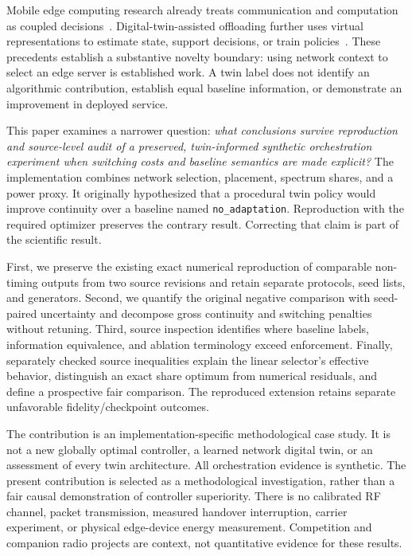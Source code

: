 \documentclass[10pt,twocolumn]{article}
\newcommand{\pol}[1]{\texttt{#1}}
\begin{document}
Mobile edge computing research already treats communication and computation as coupled decisions~\cite{mao2017survey}. Digital-twin-assisted offloading further uses virtual representations to estimate state, support decisions, or train policies~\cite{sun2020latency,dai2021stochastic,doduy2022offloading}. These precedents establish a substantive novelty boundary: using network context to select an edge server is established work. A twin label does not identify an algorithmic contribution, establish equal baseline information, or demonstrate an improvement in deployed service.

This paper examines a narrower question: \emph{what conclusions survive reproduction and source-level audit of a preserved, twin-informed synthetic orchestration experiment when switching costs and baseline semantics are made explicit?} The implementation combines network selection, placement, spectrum shares, and a power proxy. It originally hypothesized that a procedural twin policy would improve continuity over a baseline named \pol{no\_adaptation}. Reproduction with the required optimizer preserves the contrary result. Correcting that claim is part of the scientific result.

First, we preserve the existing exact numerical reproduction of comparable non-timing outputs from two source revisions and retain separate protocols, seed lists, and generators. Second, we quantify the original negative comparison with seed-paired uncertainty and decompose gross continuity and switching penalties without retuning. Third, source inspection identifies where baseline labels, information equivalence, and ablation terminology exceed enforcement. Finally, separately checked source inequalities explain the linear selector's effective behavior, distinguish an exact share optimum from numerical residuals, and define a prospective fair comparison. The reproduced extension retains separate unfavorable fidelity/checkpoint outcomes.

The contribution is an implementation-specific methodological case study. It is not a new globally optimal controller, a learned network digital twin, or an assessment of every twin architecture. All orchestration evidence is synthetic. The present contribution is selected as a methodological investigation, rather than a fair causal demonstration of controller superiority. There is no calibrated RF channel, packet transmission, measured handover interruption, carrier experiment, or physical edge-device energy measurement. Competition and companion radio projects are context, not quantitative evidence for these results.
\end{document}
